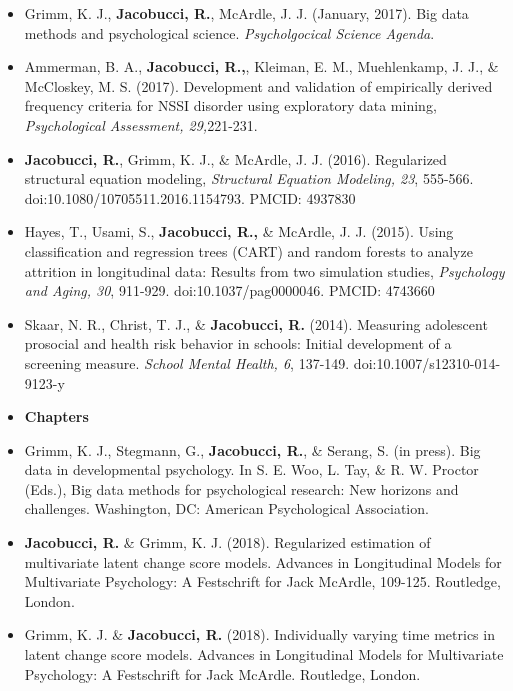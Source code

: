 \documentclass[letterpaper,10pt]{article}
\begin{document}
\begin{itemize}
%
\item[]Grimm, K. J., \textbf{Jacobucci, R.}, McArdle, J. J. (January, 2017). Big data methods and psychological science. \emph{Psycholgocical Science Agenda}.
%
\item[]Ammerman, B. A., \textbf{Jacobucci, R.,}, Kleiman, E. M., Muehlenkamp, J. J., \& McCloskey, M. S. (2017). Development and validation of empirically derived frequency criteria for NSSI disorder using exploratory data mining, \emph{Psychological Assessment, 29,}221-231.
%
\item[]\textbf{Jacobucci, R.}, Grimm, K. J., \& McArdle, J. J. (2016). Regularized structural equation modeling, \emph{Structural Equation Modeling, 23}, 555-566. doi:10.1080/10705511.2016.1154793. PMCID: 4937830
%
%
%
\item[]Hayes, T., Usami, S., \textbf{Jacobucci, R.,} \& McArdle, J. J. (2015). Using classification and regression trees (CART) and random forests to analyze attrition in longitudinal data: Results from two simulation studies, \emph{Psychology and Aging, 30}, 911-929. doi:10.1037/pag0000046. PMCID: 4743660
%
\item[]Skaar, N. R., Christ, T. J., \& \textbf{Jacobucci, R.} (2014). Measuring adolescent prosocial and health risk behavior in schools: Initial development of a screening measure. \emph{School Mental Health, 6}, 137-149. doi:10.1007/s12310-014-9123-y
%
\vspace{3mm}
%
%
%
\item {\textbf{\large{Chapters}}}
\item[]Grimm, K. J., Stegmann, G., \textbf{Jacobucci, R.}, \& Serang, S. (in press). Big data in developmental psychology. In S. E. Woo, L. Tay, \& R. W. Proctor (Eds.), Big data methods for psychological research: New horizons and challenges. Washington, DC: American Psychological Association.
%
\item[] \textbf{Jacobucci, R.} \& Grimm, K. J. (2018). Regularized estimation of multivariate latent change score models. Advances in Longitudinal Models for Multivariate Psychology: A Festschrift for Jack McArdle, 109-125. Routledge, London.
%
\item[] Grimm, K. J. \& \textbf{Jacobucci, R.} (2018). Individually varying time metrics in latent change score models. Advances in Longitudinal Models for Multivariate Psychology: A Festschrift for Jack McArdle. Routledge, London.

\end{itemize}
\end{document}
